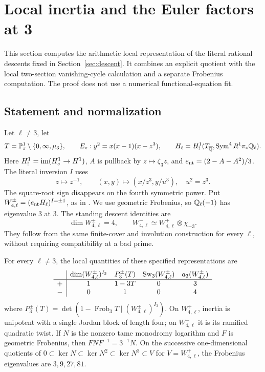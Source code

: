 \section{Local inertia and the Euler factors at 3}\label{sec:local-three}
This section computes the arithmetic local representation of the literal
rational descents fixed in Section~\ref{sec:descent}. It combines an explicit
quotient with the local two-section vanishing-cycle calculation and a separate
Frobenius computation. The proof does not use a numerical functional-equation fit.

\subsection{Statement and normalization}
Let $\ell\ne3$, let
\[
 T=\mathbb P^1_z\setminus\{0,\infty,\mu_3\},\qquad
 E_z:y^2=x(x-1)(x-z^3),\qquad
 H_\ell=H^1_!(T_{\overline{\mathbb Q}},\operatorname{Sym}^4 R^1\pi_*\mathbb Q_\ell).
\]
Here $H^1_!=\operatorname{im}(H_c^1\to H^1)$, $A$ is pullback by $z\mapsto\zeta_3z$,
and $e_{\mathrm{nt}}=(2-A-A^2)/3$. The literal inversion $I$ uses
\[
 z\mapsto z^{-1},\qquad (x,y)\mapsto(x/z^3,y/u^3),\quad u^2=z^3.
\]
The square-root sign disappears on the fourth symmetric power. Put
$W_{4,\ell}^{\pm}=(e_{\mathrm{nt}} H_\ell)^{I=\pm1}$, as in \cite{WalkeV2}.
We use geometric Frobenius, so $\mathbb Q_\ell(-1)$ has eigenvalue $3$ at $3$.
The standing descent identities are
\[
 \dim W_{4,\ell}^{\pm}=4,\qquad
 W_{4,\ell}^{-}\simeq W_{4,\ell}^{+}\otimes\chi_{-3}.
\]
They follow from the same finite-cover and involution construction for every
$\ell$, without requiring compatibility at a bad prime.

\begin{theorem}\label{p3:thm:local}
For every $\ell\ne3$, the local quantities of these specified representations are
\[
\begin{array}{c|cccc}
 &\dim(W_{4,\ell}^{\pm})^{I_3}&P_3^{\pm}(T)&\operatorname{Sw}_3(W_{4,\ell}^{\pm})&a_3(W_{4,\ell}^{\pm})\\\hline
 +&1&1-3T&0&3\\
 -&0&1&0&4
\end{array}
\]
where $P_3^{\pm}(T)=\det(1-\operatorname{Frob}_3T\mid
(W_{4,\ell}^{\pm})^{I_3})$.
On $W_{4,\ell}^{+}$, inertia is unipotent with a single Jordan block of length
four; on $W_{4,\ell}^{-}$ it is its ramified quadratic twist.
If $N$ is the nonzero tame monodromy logarithm and $F$ is geometric
Frobenius, then $FNF^{-1}=3^{-1}N$. On the successive one-dimensional
quotients of $0\subset\ker N\subset\ker N^2\subset\ker N^3\subset V$
for $V=W_{4,\ell}^+$, the Frobenius eigenvalues are $3,9,27,81$.
\end{theorem}

